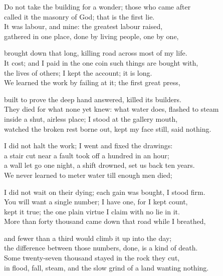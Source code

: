 \begin{founder}
Do not take the building for a wonder; those who came after\\
called it the masonry of God; that is the first lie.\\
It was labour, and mine: the greatest labour raised,\\
gathered in one place, done by living people, one by one,\\
\medskip

brought down that long, killing road across most of my life.\\
It cost; and I paid in the one coin such things are bought with,\\
the lives of others; I kept the account; it is long.\\
We learned the work by failing at it; the first great press,\\
\medskip

built to prove the deep hand answered, killed its builders.\\
They died for what none yet knew: what water does, flashed to steam\\
inside a shut, airless place; I stood at the gallery mouth,\\
watched the broken rest borne out, kept my face still, said nothing.\\
\medskip

I did not halt the work; I went and fixed the drawings:\\
a stair cut near a fault took off a hundred in an hour;\\
a wall let go one night, a shift drowned, set us back ten years.\\
We never learned to meter water till enough men died;\\
\medskip

I did not wait on their dying; each gain was bought, I stood firm.\\
You will want a single number; I have one, for I kept count,\\
kept it true; the one plain virtue I claim with no lie in it.\\
More than forty thousand came down that road while I breathed,\\
\medskip

and fewer than a third would climb it up into the day;\\
the difference between those numbers, done, is a kind of death.\\
Some twenty-seven thousand stayed in the rock they cut,\\
in flood, fall, steam, and the slow grind of a land wanting nothing.\\
\medskip


\end{founder}
